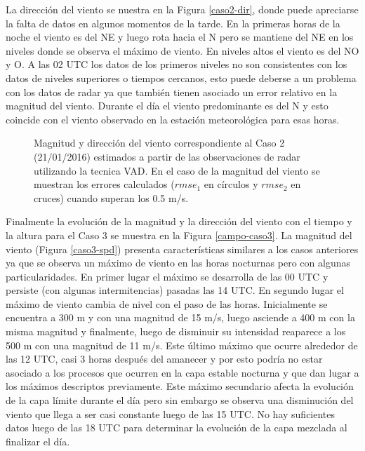 \documentclass[12pt,spanish,oneside, a4paper]{book}
\begin{document}
La dirección del viento se nuestra en la Figura \ref{caso2-dir}, donde
puede apreciarse la falta de datos en algunos momentos de la tarde. En
la primeras horas de la noche el viento es del NE y luego rota hacia el
N pero se mantiene del NE en los niveles donde se observa el máximo de
viento. En niveles altos el viento es del NO y O. A las 02 UTC los datos
de los primeros niveles no son consistentes con los datos de niveles
superiores o tiempos cercanos, esto puede deberse a un problema con los
datos de radar ya que también tienen asociado un error relativo en la
magnitud del viento. Durante el día el viento predominante es del N y
esto coincide con el viento observado en la estación meteorológica para
esas horas.

\begin{figure}
\newline{}\caption{Magnitud y dirección del viento  correspondiente al Caso 2 (21/01/2016) estimados a partir de las observaciones de radar utilizando la tecnica VAD. En el caso de la magnitud del viento se muestran los errores calculados ($rmse_1$ en círculos y $rmse_2$ en cruces) cuando superan los 0.5 m/s. \label{campo-caso2}}\label{fig:campo-caso2}
\end{figure}

Finalmente la evolución de la magnitud y la dirección del viento con el
tiempo y la altura para el Caso 3 se muestra en la Figura
\ref{campo-caso3}. La magnitud del viento (Figura \ref{caso3-spd})
presenta características similares a los casos anteriores ya que se
observa un máximo de viento en las horas nocturnas pero con algunas
particularidades. En primer lugar el máximo se desarrolla de las 00 UTC
y persiste (con algunas intermitencias) pasadas las 14 UTC. En segundo
lugar el máximo de viento cambia de nivel con el paso de las horas.
Inicialmente se encuentra a 300 m y con una magnitud de 15 m/s, luego
asciende a 400 m con la misma magnitud y finalmente, luego de disminuir
su intensidad reaparece a los 500 m con una magnitud de 11 m/s. Este
último máximo que ocurre alrededor de las 12 UTC, casi 3 horas después
del amanecer y por esto podría no estar asociado a los procesos que
ocurren en la capa estable nocturna y que dan lugar a los máximos
descriptos previamente. Este máximo secundario afecta la evolución de la
capa límite durante el día pero sin embargo se observa una disminución
del viento que llega a ser casi constante luego de las 15 UTC. No hay
suficientes datos luego de las 18 UTC para determinar la evolución de la
capa mezclada al finalizar el día.
\end{document}
